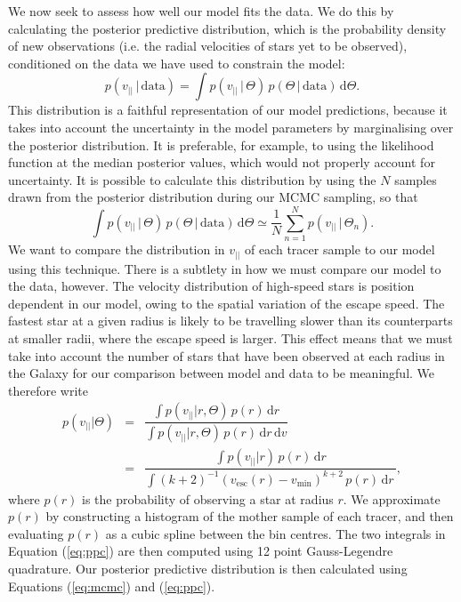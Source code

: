 \documentclass[useAMS,twocolumn,usenatbib]{mn2e}
\def\vlos{{v_{||}}}
\def\vesc{{v_\mathrm{esc}}}
\def\vmin{{v_\mathrm{min}}}
\def\intd{{\mathrm{d}}}
\begin{document}
We now seek to assess how well our model fits the data. We do this by 
calculating the posterior predictive distribution, which is the 
probability density of new observations (i.e. the radial velocities 
of stars yet to be observed), conditioned on the data we have used 
to constrain the model:
%
\begin{equation}
p(\vlos\,|\,\mathrm{data}) = \int p(\vlos\,|\,\Theta)\,p(\Theta\,|\,\mathrm{data})\,\intd \Theta.
\end{equation}
%
This distribution is a faithful representation of our model predictions, because it takes into 
account the uncertainty in the model parameters by marginalising over the posterior 
distribution. It is preferable, for example, to using the likelihood function at the 
median posterior values, which would not properly account for uncertainty. It is 
possible to calculate this distribution by using the $N$ samples drawn from 
the posterior distribution during our MCMC sampling, so that
%
\begin{equation}
\int p(\vlos\,|\,\Theta)\,p(\Theta\,|\,\mathrm{data})\,\intd \Theta \simeq \dfrac{1}{N}\sum\limits_{n=1}^Np(\vlos\,|\,\Theta_n).
\label{eq:mcmc}
\end{equation}
%
We want to compare the distribution in $\vlos$ of each tracer sample to our model using this technique. 
There is a subtlety in how we must compare our model to the data, however. The velocity distribution  
of high-speed stars is position dependent in our model, owing to the spatial variation of the escape 
speed. The fastest star at a given radius is likely to be travelling slower than its counterparts at smaller 
radii, where the escape speed is larger. This effect means that we must take into account the number of 
stars that have been observed at each radius in the Galaxy for our comparison between model and data to be 
meaningful. We therefore write  
%
\begin{eqnarray}
p(\vlos | \Theta) &=& \dfrac{\int p(\vlos | r, \Theta)\,p(r)\,\intd r}{\int p(\vlos | r, \Theta)\,p(r)\,\intd r\,\intd v} \nonumber \\
                  &=& \dfrac{\int p(\vlos | r)\,p(r)\,\intd r}{\int (k+2)^{-1}(\vesc(r) - \vmin)^{k+2}\,p(r)\,\intd r\,},
\label{eq:ppc}
\end{eqnarray}
%
where $p(r)$ is the probability of observing a star at radius $r$. We approximate 
$p(r)$ by constructing a histogram of the mother sample of each tracer, and then 
evaluating $p(r)$ as a cubic spline between the bin centres. The two integrals in 
Equation (\ref{eq:ppc}) are then computed using 12 point Gauss-Legendre quadrature. 
Our posterior predictive distribution is then calculated using Equations (\ref{eq:mcmc}) 
and (\ref{eq:ppc}).
\end{document}
